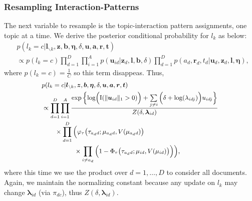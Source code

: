 \documentclass[twoside]{article}
\begin{document}
  	    \subsubsection{Resampling Interaction-Patterns}  \label{subsubsec: Resampling C}
  	   The next variable to resample is the topic-interaction pattern assignments, one topic at a time. We derive the posterior conditional probability for $l_k$ as below:
  	     \begin{equation*}
  	     \begin{aligned} & 
  	     p(l_k=c|\boldsymbol{l}_{\backslash k}, \boldsymbol{z}, \boldsymbol{b},\boldsymbol{\eta}, \delta, \boldsymbol{u}, \boldsymbol{a}, \boldsymbol{r}, \boldsymbol{t})\\
  	     &\propto p(l_k=c)\prod_{d=1}^D\prod_{i=1}^A p(\boldsymbol{u}_{id}| \boldsymbol{z}_d,  \boldsymbol{l}, \boldsymbol{b}, \delta) \prod_{d=1}^Dp({a}_d, \boldsymbol{r}_d, {t}_d|\boldsymbol{u}_d, \boldsymbol{z}_d,  \boldsymbol{l}, \boldsymbol{\eta}),
  	     \end{aligned}
  	     \end{equation*}
  	     where $p(l_k=c) = \frac{1}{C}$ so this term disappeas. Thus, 
  	        \begin{equation*}
  	          	   \footnotesize
  	        \begin{aligned} & 
  	        p(l_k=c|\boldsymbol{l}_{\backslash k}, \boldsymbol{z}, \boldsymbol{b},\boldsymbol{\eta}, \delta, \boldsymbol{u}, \boldsymbol{a}, \boldsymbol{r}, \boldsymbol{t})\\
  	        &  \propto\prod_{d=1}^D
  	     \prod_{i=1}^A \frac{\exp\Big\{\mbox{log}\Big(\text{I}( \lVert \boldsymbol{u}_{id}\rVert_1 > 0 )\Big) + \sum\limits_{j \neq i} \Big(\delta+\mbox{log}(\lambda_{idj})\Big)u_{idj}\Big\}}{Z(\delta,\boldsymbol{\lambda}_{id})}
  	        \\& \quad\quad\times\prod_{d=1}^D\Big(\varphi_{\tau}\big(\tau_{a_d d}; \mu_{a_d d}, V(\mu_{a_d d})\big) \\&\quad\quad\quad\quad\quad\times \prod_{i\neq a_d}\Big(1-\Phi_{\tau} \big(\tau_{a_d d}; \mu_{i d}, V(\mu_{i d})\big) \Big)\Big),
  	        \end{aligned}
  	        \end{equation*}
  	        where this time we use the product over $d=1,\ldots, D$ to consider all documents. Again, we maintain the normalizing constant because any update on $l_k$ may change $\boldsymbol{\lambda}_{id}$ (via $\pi_{dc}$), thus $Z(\delta,\boldsymbol{\lambda}_{id})$.
  	        
\end{document}
